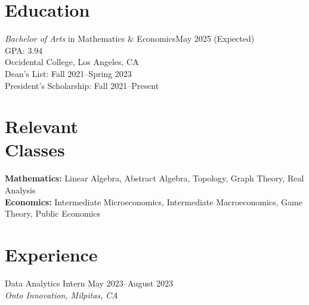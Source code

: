 \documentclass[margin, 10pt]{res} %
\begin{document}
\begin{resume}


\section{\sc Education}

{\sl Bachelor of Arts} in Mathematics \& Economics\hfill May 2025 (Expected) \\
GPA: 3.94\\
Occidental College, Los Angeles, CA \\
Dean's List: Fall 2021--Spring 2023\\
President's Scholarship: Fall 2021--Present
\section{\sc Relevant \\ Classes}

\textbf{Mathematics:} Linear Algebra, Abstract Algebra, Topology, Graph Theory, Real Analysis\\
\textbf{Economics:} Intermediate Microeconomics, Intermediate Macroeconomics, Game Theory, Public Economics

 
\section{\sc Experience}
{Data Analytics Intern} \hfill May 2023--August 2023 \\
\textit{Onto Innovation, Milpitas, CA}


\end{resume}
\end{document}
